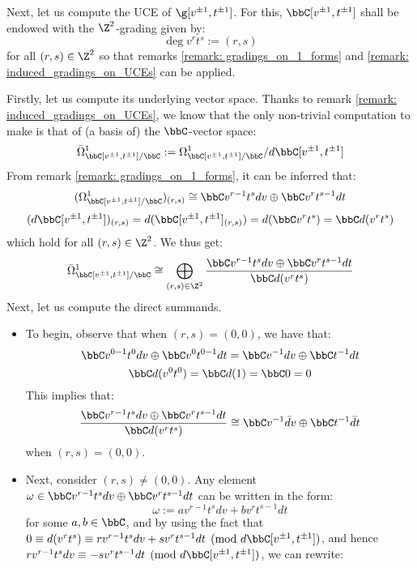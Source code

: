         \begin{example} \label{example: toroidal_lie_algebras_centres}
            Next, let us compute the UCE of $\g[v^{\pm 1}, t^{\pm 1}]$. For this, $\bbC[v^{\pm 1}, t^{\pm 1}]$ shall be endowed with the $\Z^2$-grading given by:
                $$\deg v^r t^s := (r, s)$$
            for all $(r, s) \in \Z^2$ so that remarks \ref{remark: gradings_on_1_forms} and \ref{remark: induced_gradings_on_UCEs} can be applied. 
            
            Firstly, let us compute its underlying vector space. Thanks to remark \ref{remark: induced_gradings_on_UCEs}, we know that the only non-trivial computation to make is that of (a basis of) the $\bbC$-vector space:
                $$\bar{\Omega}^1_{\bbC[v^{\pm 1}, t^{\pm 1}]/\bbC} := \Omega^1_{\bbC[v^{\pm 1}, t^{\pm 1}]/\bbC}/d\bbC[v^{\pm 1}, t^{\pm 1}]$$
            From remark \ref{remark: gradings_on_1_forms}, it can be inferred that:
                $$( \Omega^1_{\bbC[v^{\pm 1}, t^{\pm 1}]/\bbC} )_{(r, s)} \cong \bbC v^{r - 1} t^s dv \oplus \bbC v^r t^{s - 1} dt$$
                $$( d\bbC[v^{\pm 1}, t^{\pm 1}] )_{(r, s)} = d( \bbC[v^{\pm 1}, t^{\pm 1}]_{(r, s)} ) = d( \bbC v^r t^s ) = \bbC d(v^r t^s)$$
            which hold for all $(r, s) \in \Z^2$. We thus get:
                $$\bar{\Omega}^1_{\bbC[v^{\pm 1}, t^{\pm 1}]/\bbC} \cong \bigoplus_{(r, s) \in \Z^2} \frac{ \bbC v^{r - 1} t^s dv \oplus \bbC v^r t^{s - 1} dt }{ \bbC d(v^r t^s) }$$
            Next, let us compute the direct summands.
            \begin{itemize}
                \item To begin, observe that when $(r, s) = (0, 0)$, we have that:
                    $$\bbC v^{0 - 1} t^0 dv \oplus \bbC v^0 t^{0 - 1} dt = \bbC v^{-1} dv \oplus \bbC t^{-1} dt$$
                    $$\bbC d(v^0 t^0) = \bbC d(1) = \bbC 0 = 0$$
                This implies that:
                    $$\frac{ \bbC v^{r - 1} t^s dv \oplus \bbC v^r t^{s - 1} dt }{ \bbC d(v^r t^s) } \cong \bbC v^{-1} \bar{d}v \oplus \bbC t^{-1} \bar{d}t$$
                when $(r, s) = (0, 0)$.
                \item Next, consider $(r, s) \not = (0, 0)$. Any element $\omega \in \bbC v^{r - 1} t^s dv \oplus \bbC v^r t^{s - 1} dt$ can be written in the form:
                    $$\omega := a v^{r - 1} t^s dv + b v^r t^{s - 1} dt$$
                for some $a, b \in \bbC$, and by using the fact that $0 \equiv d(v^r t^s) \equiv r v^{r - 1} t^s dv + s v^r t^{s - 1} dt \pmod{d\bbC[v^{\pm 1}, t^{\pm 1}]}$, and hence $r v^{r - 1} t^s dv \equiv -s v^r t^{s - 1} dt \pmod{d\bbC[v^{\pm 1}, t^{\pm 1}]}$, we can rewrite:

\end{itemize}
\end{example}
